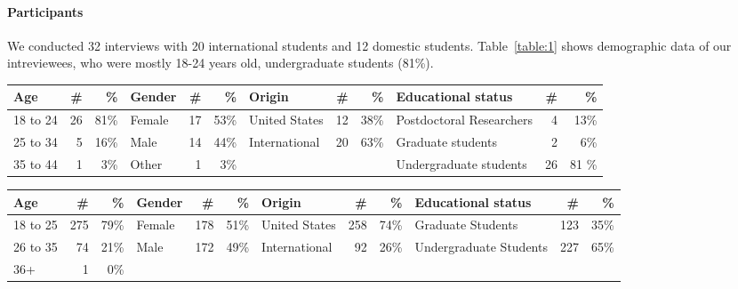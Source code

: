 \paragraph{Participants}
We conducted 32 interviews with 20
international students and 12 domestic students. Table~\ref{table:1} shows demographic data of our intreviewees, who were mostly 18-24 years old, undergraduate students (81\%).

\begin{table*}[h!]
\centering
\begin{tabular}{l r r |l r r|l r r|l r r} 
 \hline
 Age & \# & \% & Gender & \# & \% & Origin & \# & \% & Educational status & \# & \% \\
\hline
18 to 24 & 26 & 81\% & Female & 17 & 53\% & United States & 12 & 38\% & Postdoctoral Researchers & 4 & 13\% \\
25 to 34 & 5 & 16\% & Male & 14 & 44\% & International & 20 & 63\% & Graduate students & 2 & 6\% \\
35 to 44 & 1 & 3\% & Other & 1 & 3\% & & & & Undergraduate students & 26 & 81 \% \\
 \hline
\end{tabular}
\caption{The distribution over age, gender, origin and education status for 32 interview participants, at the time of collecting the data. Our 20 International participants came from 17 different countries.}
\label{table:1}
\end{table*}

\begin{table*}[h!]
\centering
\begin{tabular}{l r r |l r r|l r r|l r r} 
 \hline
 Age & \# & \% & Gender & \# & \% & Origin & \# & \% & Educational status & \# & \% \\
\hline
18 to 25 & 275 & 79\% & Female & 178 & 51\% & United States & 258 & 74\% & Graduate Students & 123 & 35\% \\
26 to 35 & 74 & 21\% & Male & 172 & 49\% & International & 92 & 26\% & Undergraduate Students & 227 & 65\% \\
36+ & 1 & 0\% & & & & & & & & & \\
 \hline
\end{tabular}
\caption{The distribution over age, gender, origin and education status for 350 survey participants, at the time of collecting the data. Our 92 International participants came from 32 different countries.}
\label{table:2}
\end{table*}

